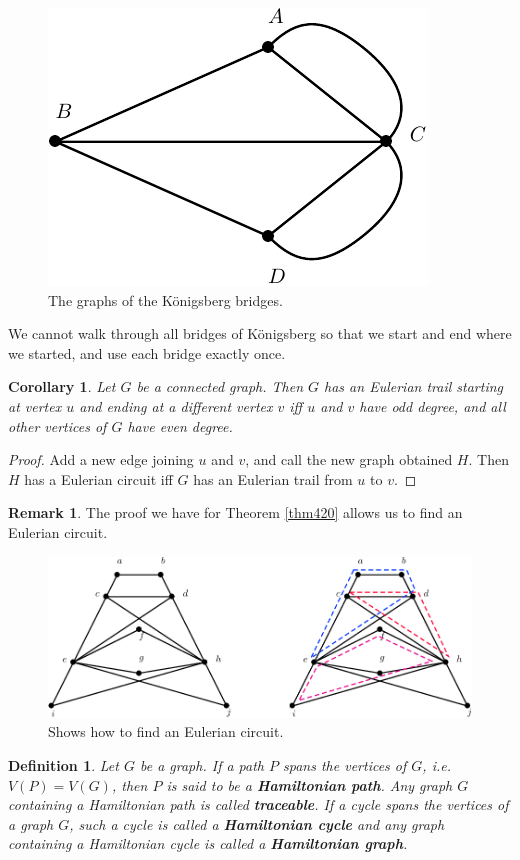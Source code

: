 \documentclass[12pt,a4paper]{article}
\newtheorem{cor}{Corollary}[section]
\newtheorem{defn}{Definition}[section]
\theoremstyle{definition}
\newtheorem{rem}{Remark}[section]
\begin{document}
\newpage
\begin{figure}[hbtp]
\centering
\includegraphics[scale=1]{images/graph35.pdf}
\caption{The graphs of the Königsberg bridges.}
\end{figure}
We cannot walk through all bridges of Königsberg so that we start and end where we started, and use each bridge exactly once. 
\begin{cor} Let $G$ be a connected graph. Then $G$ has an Eulerian trail starting at vertex $u$ and ending at a different vertex $v$ iff $u$ and $v$ have odd degree, and all other vertices of $G$ have even degree. 
\end{cor}
\begin{proof}
Add a new edge joining $u$ and $v$, and call the new graph obtained $H$. Then $H$ has a Eulerian circuit iff $G$ has an Eulerian trail from $u$ to $v$. 
\end{proof}
\begin{rem} The proof we have for Theorem \ref{thm420} allows us to find an Eulerian circuit. 
\begin{figure}[hbtp]
\centering
\includegraphics[scale=.9]{images/graph36.pdf}
\caption{Shows how to find an Eulerian circuit.}
\end{figure}
\end{rem}
\newpage
\begin{defn} Let $G$ be a graph. If a path $P$ spans the vertices of $G$, i.e. $V(P)=V(G)$, then $P$ is said to be a \textbf{Hamiltonian path}. Any graph $G$ containing a Hamiltonian path is called \textbf{traceable}. If a cycle spans the vertices of a graph $G$, such a cycle is called a \textbf{Hamiltonian cycle} and any graph containing a Hamiltonian cycle is called a \textbf{Hamiltonian graph}.  
\end{defn}
\end{document}
